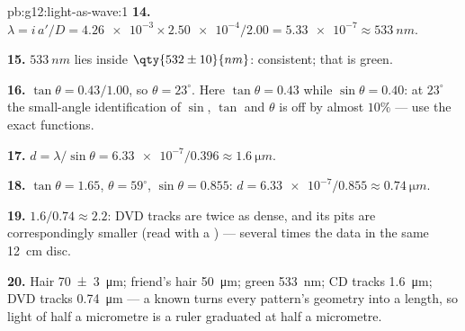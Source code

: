 \begin{solution}{pb:g12:light-as-wave:1}
\textbf{14.} $\lambda = i\,a'/D = \num{4.26e-3} \times
\num{2.50e-4}/2.00 = \num{5.33e-7} \approx \qty{533}{nm}$.

\textbf{15.} $\qty{533}{nm}$ lies inside $\qty{532 \pm 10}{nm}$:
consistent; that  is green.

\textbf{16.} $\tan\theta = 0.43/1.00$, so $\theta = 23^\circ$. Here
$\tan\theta = 0.43$ while $\sin\theta = 0.40$: at $23^\circ$ the
small-angle identification of $\sin$, $\tan$ and $\theta$ is off by
almost $10\%$ --- use the exact functions.

\textbf{17.} $d = \lambda/\sin\theta = \num{6.33e-7}/0.396 \approx
\qty{1.6}{\micro m}$.

\textbf{18.} $\tan\theta = 1.65$, $\theta = 59^\circ$,
$\sin\theta = 0.855$: $d = \num{6.33e-7}/0.855 \approx
\qty{0.74}{\micro m}$.

\textbf{19.} $1.6/0.74 \approx 2.2$: DVD tracks are twice as dense,
and its pits are correspondingly smaller (read with a
 ) --- several times the data in the same
\qty{12}{cm} disc.

\textbf{20.} Hair \qty{70 \pm 3}{\micro m}; friend's hair
\qty{50}{\micro m}; green  \qty{533}{nm}; CD tracks
\qty{1.6}{\micro m}; DVD tracks \qty{0.74}{\micro m} --- a known
 turns every pattern's geometry into a length, so light of
half a micrometre is a ruler graduated at half a micrometre.
\end{solution}
